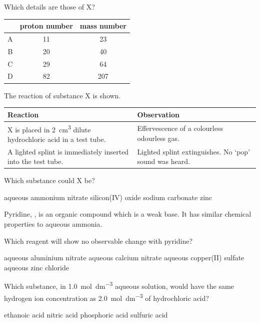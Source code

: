 \documentclass[11pt]{exam}
\begin{document}
\begin{questions}
Which details are those of X?

\begin{tabular}{|c|c|c|}
\hline
 & proton number & mass number \\
\hline
A & 11 & 23 \\
B & 20 & 40 \\
C & 29 & 64 \\
D & 82 & 207 \\
\hline
\end{tabular}

\question The reaction of substance X is shown.

\begin{tabular}{|l|l|}
\hline
Reaction & Observation \\
\hline
X is placed in 2~cm\textsuperscript{3} dilute hydrochloric acid in a test tube. & Effervescence of a colourless odourless gas. \\
\hline
A lighted splint is immediately inserted into the test tube. & Lighted splint extinguishes. No `pop' sound was heard. \\
\hline
\end{tabular}

Which substance could X be?

\begin{choices}
\choice aqueous ammonium nitrate
\choice silicon(IV) oxide
\choice sodium carbonate
\choice zinc
\end{choices}

\question Pyridine, , is an organic compound which is a weak base. It has similar chemical properties to aqueous ammonia.

Which reagent will show no observable change with pyridine?

\begin{choices}
\choice aqueous aluminium nitrate
\choice aqueous calcium nitrate
\choice aqueous copper(II) sulfate
\choice aqueous zinc chloride
\end{choices}

\question Which substance, in \qty{1.0}{\mol\per\dm\cubed} aqueous solution, would have the same hydrogen ion concentration as \qty{2.0}{\mol\per\dm\cubed} of hydrochloric acid?

\begin{choices}
\choice ethanoic acid
\choice nitric acid
\choice phosphoric acid
\choice sulfuric acid
\end{choices}

\newpage


\end{questions}
\end{document}
